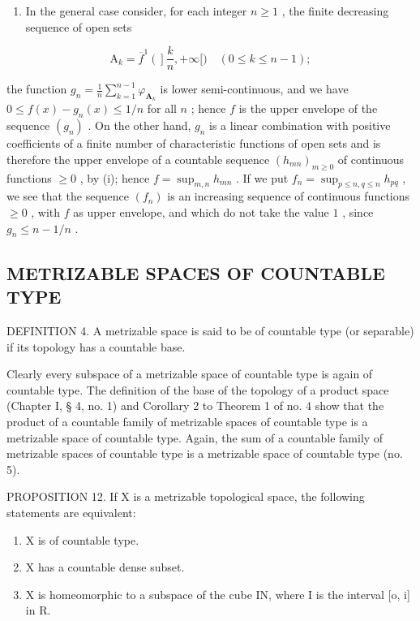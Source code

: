 \begin{enumerate}
\def\labelenumi{(\roman{enumi})}
\setcounter{enumi}{1}
\tightlist
\item
  In the general case consider, for each integer \(n \geqslant 1\) , the finite decreasing sequence of open sets
\end{enumerate}

\[
\mathrm{A} _ {k} = \overline {{{f}}} ^ {1} \left(\right] \frac {k}{n}, + \infty [) \quad (0 \leqslant k \leqslant n - 1);
\]

the function \(g_{n} = \frac{1}{n}\sum_{k=1}^{n-1}\varphi_{\mathbf{A}_k}\) is lower semi-continuous, and we have \(0 \leqslant f(x) - g_{n}(x) \leqslant 1/n\) for all \(n\) ; hence \(f\) is the upper envelope of the sequence \((g_n)\) . On the other hand, \(g_{n}\) is a linear combination with positive coefficients of a finite number of characteristic functions of open sets and is therefore the upper envelope of a countable sequence \((h_{mn})_{m \geqslant 0}\) of continuous functions \(\geqslant 0\) , by (i); hence \(f = \sup_{m,n} h_{mn}\) . If we put \(f_{n} = \sup_{p \leqslant n, q \leqslant n} h_{pq}\) , we see that the sequence \((f_n)\) is an increasing sequence of continuous functions \(\geqslant 0\) , with \(f\) as upper envelope, and which do not take the value \(1\) , since \(g_{n} \leqslant n - 1/n\) .

\subsection{METRIZABLE SPACES OF COUNTABLE TYPE}

DEFINITION 4. A metrizable space is said to be of countable type (or separable) if its topology has a countable base.

Clearly every subspace of a metrizable space of countable type is again of countable type. The definition of the base of the topology of a product space (Chapter I, § 4, no. 1) and Corollary 2 to Theorem 1 of no. 4 show that the product of a countable family of metrizable spaces of countable type is a metrizable space of countable type. Again, the sum of a countable family of metrizable spaces of countable type is a metrizable space of countable type (no. 5).

PROPOSITION 12. If X is a metrizable topological space, the following statements are equivalent:

\begin{enumerate}
\def\labelenumi{\alph{enumi})}
\item
  X is of countable type.
\item
  X has a countable dense subset.
\item
  X is homeomorphic to a subspace of the cube IN, where I is the interval {[}o, i{]} in R.
\end{enumerate}

